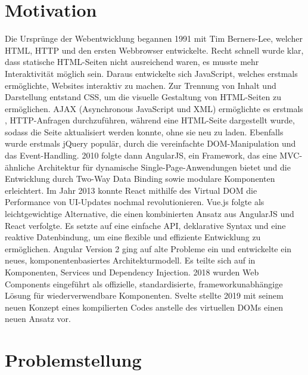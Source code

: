 \documentclass[oneside]{ausarbeitung}
\begin{document}
\section{Motivation}
\label{sec:motivation}

Die Ursprünge der Webentwicklung begannen 1991 mit Tim Berners-Lee, welcher HTML, HTTP und den ersten Webbrowser entwickelte.
Recht schnell wurde klar, dass statische HTML-Seiten nicht ausreichend waren, es musste mehr Interaktivität möglich sein. Daraus entwickelte sich JavaScript, welches erstmals ermöglichte, Websites interaktiv zu machen.
Zur Trennung von Inhalt und Darstellung entstand CSS, um die visuelle Gestaltung von HTML-Seiten zu ermöglichen.
AJAX (Asynchronous JavaScript und XML) ermöglichte es erstmals , HTTP-Anfragen durchzuführen, während eine HTML-Seite dargestellt wurde, sodass die Seite aktualisiert werden konnte, ohne sie neu zu laden.
Ebenfalls wurde erstmals jQuery populär, durch die vereinfachte DOM-Manipulation und das Event-Handling.
2010 folgte dann AngularJS, ein Framework, das eine MVC-ähnliche Architektur für dynamische Single-Page-Anwendungen bietet und die Entwicklung durch Two-Way Data Binding sowie modulare Komponenten erleichtert.
Im Jahr 2013 konnte React mithilfe des Virtual DOM die Performance von UI-Updates nochmal revolutionieren.
Vue.js folgte als leichtgewichtige Alternative, die einen kombinierten Ansatz aus AngularJS und React verfolgte. Es setzte auf eine einfache API, deklarative Syntax und eine reaktive Datenbindung, um eine flexible und effiziente Entwicklung zu ermöglichen.
Angular Version 2 ging auf alte Probleme ein und entwickelte ein neues, komponentenbasiertes Architekturmodell. Es teilte sich auf in Komponenten, Services und Dependency Injection. 
2018 wurden Web Components eingeführt als offizielle, standardisierte, frameworkunabhängige Lösung für wiederverwendbare Komponenten.
Svelte stellte 2019 mit seinem neuen Konzept eines kompilierten Codes anstelle des virtuellen DOMs einen neuen Ansatz vor.


\section{Problemstellung}
\label{sec:problemstellung}
\end{document}
